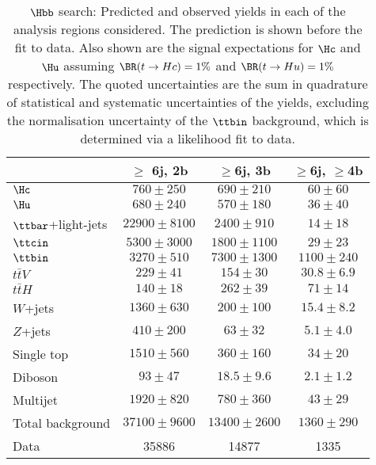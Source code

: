 \begin{table}[htbp]
\begin{center}
\begin{tabular}{l*{3}{c}}
\hline\hline
 & $\geq$ 6j, 2b & $\geq$6j, 3b & $\geq$6j, $\geq$4b \\
\hline
$\Hc$ & $ 760 \pm 250 $ &   $ 690 \pm 210 $ &   $ 60 \pm 60 $ \\ 
$\Hu$ & $ 680 \pm 240 $ &   $ 570 \pm 180 $ &   $ 36 \pm 40 $ \\ 
\hline
$\ttbar$+light-jets  &   $ 22900 \pm 8100 $ &   $ 2400 \pm 910 $ &   $ 14 \pm 18 $ \\ 
$\ttcin$  &   $ 5300 \pm 3000 $ &   $ 1800 \pm 1100 $ &   $ 29 \pm 23 $ \\ 
$\ttbin$  &   $ 3270 \pm 510 $ &   $ 7300 \pm 1300 $ &   $ 1100 \pm 240 $ \\ 
$t\bar{t}V$  &   $ 229 \pm 41 $ &   $ 154 \pm 30 $ &   $ 30.8 \pm 6.9 $ \\ 
$t\bar{t}H$  &   $ 140 \pm 18 $ &   $ 262 \pm 39 $ &   $ 71 \pm 14 $ \\ 
$W$+jets  &   $ 1360 \pm 630 $ &   $ 200 \pm 100 $ &   $ 15.4 \pm 8.2 $ \\ 
$Z$+jets  &   $ 410 \pm 200 $ &   $ 63 \pm 32 $ &   $ 5.1 \pm 4.0 $ \\ 
Single top  &   $ 1510 \pm 560 $ &   $ 360 \pm 160 $ &   $ 34 \pm 20 $ \\ 
Diboson  &   $ 93 \pm 47 $ &   $ 18.5 \pm 9.6 $ &   $ 2.1 \pm 1.2 $ \\ 
Multijet  &   $ 1920 \pm 820 $ &   $ 780 \pm 360 $ &   $ 43 \pm 29 $ \\ 
\hline
Total background &  $ 37100 \pm 9600 $ &   $ 13400 \pm 2600 $ &   $ 1360 \pm 290 $ \\ 
\hline
Data & 35886  & 14877  & 1335  \\ 
\hline\hline    
\end{tabular}

%
\end{center}
\caption{
$\Hbb$ search: Predicted and observed yields in each of the analysis regions considered.
The prediction is shown before the fit to data. Also shown are the signal expectations for 
$\Hc$ and $\Hu$ assuming $\BR(t\to Hc)=1\%$ and $\BR(t\to Hu)=1\%$ respectively.
The quoted uncertainties are the sum in quadrature of statistical and systematic uncertainties of the yields, 
excluding the normalisation uncertainty of the $\ttbin$ background, which is determined via a likelihood fit to data.
}
\label{tab:Hbb_Prefit_Yields_Unblind}
\end{table} 


